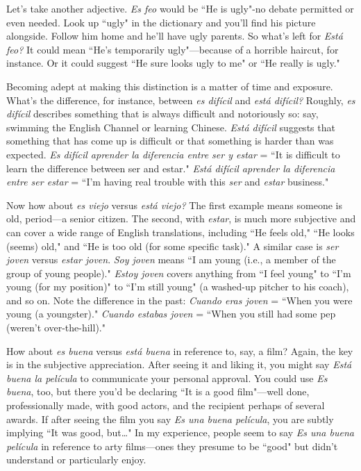 Let's take another adjective. \emph{Es feo} would be ``He is ugly"-no
debate permitted or even needed. Look up ``ugly" in the dictionary and
you'll find his picture alongside. Follow him home and he'll have ugly
parents. So what's left for \emph{Está feo?} It could mean ``He's temporarily
ugly"---because of a horrible haircut, for instance. Or it could suggest
``He sure looks ugly to me" or ``He really is ugly."

Becoming adept at making this distinction is a matter of time
and exposure. What's the difference, for instance, between \emph{es difícil}
and \emph{está difícil?} Roughly, \emph{es difícil} describes something that is always
difficult and notoriously so: say, swimming the English Channel or
learning Chinese. \emph{Está difícil} suggests that something that has come
up is difficult or that something is harder than was expected. \emph{Es difícil aprender la diferencia entre ser y estar}
 = ``It is difficult to learn the
 difference between ser and estar." \emph{Está difícil aprender la diferencia
 entre ser estar} = ``I'm having real trouble with this \emph{ser} and \emph{estar}
business."

Now how about \emph{es viejo} versus \emph{está viejo?} The first example
means someone is old, period---a senior citizen. The second, with
\emph{estar}, is much more subjective and can cover a wide range of English
translations, including ``He feels old," ``He looks (seems) old," and
``He is too old (for some specific task)." A similar case is \emph{ser joven}
versus \emph{estar joven}. \emph{Soy joven} means ``I am young (i.e., a member
of the group of young people)." \emph{Estoy joven} covers anything from ``I
feel young" to ``I'm young (for my position)" to ``I'm still young" (a
washed-up pitcher to his coach), and so on. Note the difference in the
past: \emph{Cuando eras joven} = ``When you were young (a youngster)."
\emph{Cuando estabas joven} = ``When you still had some pep (weren't over-the-hill)."

How about \emph{es buena} versus \emph{está buena} in reference to, say, a
film? Again, the key is in the subjective appreciation. After seeing it
and liking it, you might say \emph{Está buena la película} to communicate
your personal approval. You could use \emph{Es buena}, too, but there you'd
be declaring ``It is a good film"---well done, professionally made, with
good actors, and the recipient perhaps of several awards. If after seeing
the film you say \emph{Es una buena película}, you are subtly implying ``It
was good, but\ldots{}" In my experience, people seem to say \emph{Es una
buena película} in reference to arty films---ones they presume to be
``good" but didn't understand or particularly enjoy.

